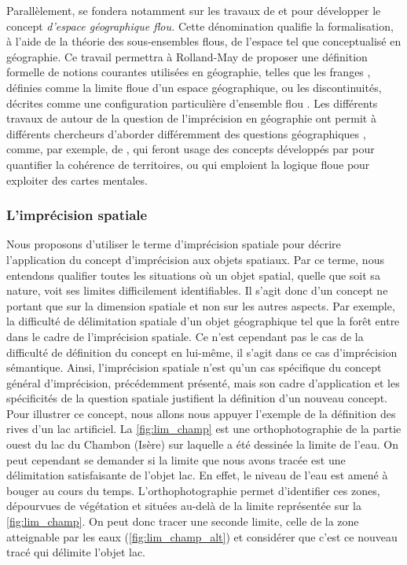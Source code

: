 Parallèlement, \textcite{Rolland-May1984,Rolland-May1987} se fondera
notamment sur les travaux de \textcite{Gale1972,Gale1976} et
\textcite{Leung1979} pour développer le concept\emph{ d’espace
  géographique flou.} Cette dénomination qualifie la formalisation, à
l’aide de la théorie des sous-ensembles flous, de l’espace tel que
conceptualisé en géographie. Ce travail permettra à Rolland-May de
proposer une définition formelle de notions courantes utilisées en
géographie, telles que les franges \autocite{Rolland-May1987},
définies comme la limite floue d’un espace géographique, ou les
discontinuités, décrites comme une configuration particulière
d’ensemble flou \autocite{Rolland-May2003}. Les différents travaux de
 autour de la question de l’imprécision en géographie
ont permit à différents chercheurs d’aborder différemment des
questions géographiques \textcite{Dutozia2014}, comme, par exemple, de
\textcite{Ruffray2004}, qui feront usage des concepts développés par
 pour quantifier la cohérence de territoires, ou
\textcite{Didelon2011} qui emploient la logique floue pour exploiter
des cartes mentales.

\subsubsection{L’imprécision spatiale}

Nous proposons d’utiliser le terme d’imprécision spatiale pour décrire
l’application du concept d’imprécision aux objets spatiaux. Par ce
terme, nous entendons qualifier toutes les situations où un objet
spatial, quelle que soit sa nature, voit ses limites difficilement
identifiables. Il s’agit donc d’un concept ne portant que sur la
dimension spatiale et non sur les autres aspects. Par exemple, la
difficulté de délimitation spatiale d’un objet géographique tel que la
forêt entre dans le cadre de l’imprécision spatiale. Ce n’est
cependant pas le cas de la difficulté de définition du concept en
lui-même, il s’agit dans ce cas d’imprécision sémantique. Ainsi,
l’imprécision spatiale n’est qu’un cas spécifique du concept général
d’imprécision, précédemment présenté, mais son cadre d’application et
les spécificités de la question spatiale justifient la définition d’un
nouveau concept.  Pour illustrer ce concept, nous allons nous appuyer
l’exemple de la définition des rives d’un lac artificiel. La
\autoref{fig:lim_champ} est une orthophotographie de la partie ouest
du lac du Chambon (Isère) sur laquelle a été dessinée la limite de
l’eau. On peut cependant se demander si la limite que nous avons
tracée est une délimitation satisfaisante de l’objet lac. En effet, le
niveau de l’eau est amené à bouger au cours du
temps. L’orthophotographie permet d’identifier ces zones, dépourvues
de végétation et situées au-delà de la limite représentée sur la
\autoref{fig:lim_champ}. On peut donc tracer une seconde limite, celle
de la zone atteignable par les eaux (\autoref{fig:lim_champ_alt}) et
considérer que c’est ce nouveau tracé qui délimite l’objet lac.

